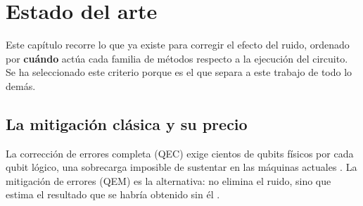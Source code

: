\chapter{Estado del arte}
\label{cap:sota}

%
%
%
%
%

Este capítulo recorre lo que ya existe para corregir el efecto del ruido, ordenado por
\textbf{cuándo} actúa cada familia de métodos respecto a la ejecución del circuito. Se ha seleccionado
este criterio porque es el que separa a este trabajo de todo lo demás.

\section{La mitigación clásica y su precio}
\label{sec:qem_clasico}

La corrección de errores completa (QEC) exige cientos de qubits físicos por cada qubit
lógico, una sobrecarga imposible de sustentar en las máquinas actuales \cite{preskill2018nisq}. La
mitigación de errores (QEM) es la alternativa: no elimina el ruido, sino que
estima el resultado que se habría obtenido sin él \cite{cai2023quantum}.

